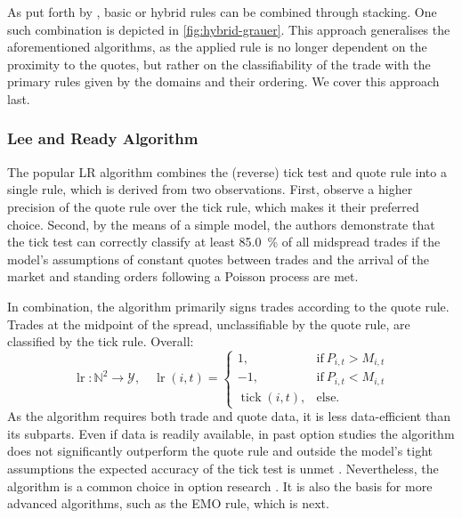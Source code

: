As put forth by \textcite[][18]{grauerOptionTradeClassification2022}, basic or hybrid rules can be combined through stacking. One such combination is depicted in \cref{fig:hybrid-grauer}. This approach generalises the aforementioned algorithms, as the applied rule is no longer dependent on the proximity to the quotes, but rather on the classifiability of the trade with the primary rules given by the domains and their ordering. We cover this approach last.

\subsubsection{Lee and Ready Algorithm}\label{sec:lee-and-ready-algorithm}

The popular \gls{LR} algorithm \autocite[][745]{leeInferringTradeDirection1991} combines the (reverse) tick test and quote rule into a single rule, which is derived from two observations. First, \textcite[][735--743]{leeInferringTradeDirection1991} observe a higher precision of the quote rule over the tick rule, which makes it their preferred choice. Second, by the means of a simple model, the authors demonstrate that the tick test can correctly classify at least \SI{85.0}{\percent} of all midspread trades if the model's assumptions of constant quotes between trades and the arrival of the market and standing orders following a Poisson process are met.

In combination, the algorithm primarily signs trades according to the quote rule. Trades at the midpoint of the spread, unclassifiable by the quote rule, are classified by the tick rule. Overall:
\begin{equation}
    \operatorname{lr} \colon \mathbb{N}^2 \to \mathcal{Y},\quad\operatorname{lr}(i,t)=
    \begin{cases}
        1,                         & \mathrm{if}\ P_{i, t} > M_{i, t} \\
        -1,                        & \mathrm{if}\ P_{i, t} < M_{i, t} \\
        \operatorname{tick}(i, t), & \mathrm{else}.
    \end{cases}
\end{equation}
As the algorithm requires both trade and quote data, it is less data-efficient than its subparts. Even if data is readily available, in past option studies the algorithm does not significantly outperform the quote rule and outside the model's tight assumptions the expected accuracy of the tick test is unmet \autocites[][30--32]{grauerOptionTradeClassification2022}[][886]{savickasInferringDirectionOption2003}. Nevertheless, the algorithm is a common choice in option research \autocite[cp.][453]{easleyOptionVolumeStock1998}. It is also the basis for more advanced algorithms, such as the \gls{EMO} rule, which is next.

